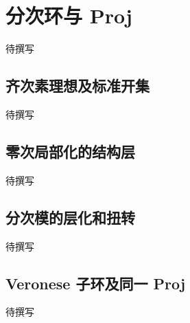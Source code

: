 
% 
% 

\section{分次环与 Proj}
\label{g5:sec:1401}

待撰写

\subsection{齐次素理想及标准开集}
\label{g5:subsec:1401:01}
待撰写

\subsection{零次局部化的结构层}
\label{g5:subsec:1401:02}
待撰写

\subsection{分次模的层化和扭转}
\label{g5:subsec:1401:03}
待撰写

\subsection{Veronese 子环及同一 Proj}
\label{g5:subsec:1401:04}
待撰写
